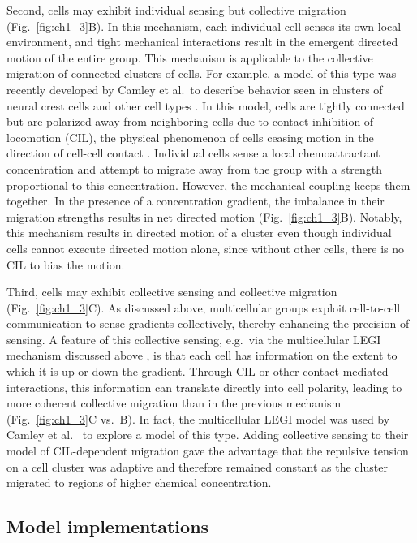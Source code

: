 Second, cells may exhibit individual sensing but collective migration (Fig.\ \ref{fig:ch1_3}B). In this mechanism, each individual cell senses its own local environment, and tight mechanical interactions result in the emergent directed motion of the entire group. This mechanism is applicable to the collective migration of connected clusters of cells. For example, a model of this type was recently developed by Camley et al.\ to describe behavior seen in clusters of neural crest cells and other cell types \cite{camley2016emergent}. In this model, cells are tightly connected but are polarized away from neighboring cells due to contact inhibition of locomotion (CIL), the physical phenomenon of cells ceasing motion in the direction of cell-cell contact \cite{mayor2010keeping}. Individual cells sense a local chemoattractant concentration and attempt to migrate away from the group with a strength proportional to this concentration.
However, the mechanical coupling keeps them together. In the presence of a concentration gradient, the imbalance in their migration strengths results in net directed motion (Fig.\ \ref{fig:ch1_3}B). Notably, this mechanism results in directed motion of a cluster even though individual cells cannot execute directed motion alone, since without other cells, there is no CIL to bias the motion.

Third, cells may exhibit collective sensing and collective migration (Fig.\ \ref{fig:ch1_3}C). As discussed above, multicellular groups exploit cell-to-cell communication to sense gradients collectively, thereby enhancing the precision of sensing. A feature of this collective sensing, e.g.\ via the multicellular LEGI mechanism discussed above \cite{ellison2016cell, mugler2016limits}, is that each cell has information on the extent to which it is up or down the gradient. Through CIL or other contact-mediated interactions, this information can translate directly into cell polarity, leading to more coherent collective migration than in the previous mechanism (Fig.\ \ref{fig:ch1_3}C vs.\ B). In fact, the multicellular LEGI model was used by Camley et al.\ \cite{camley2016emergent} to explore a model of this type. Adding collective sensing to their model of CIL-dependent migration gave the advantage that the repulsive tension on a cell cluster was adaptive and therefore remained constant as the cluster migrated to regions of higher chemical concentration.

\subsection{Model implementations}

